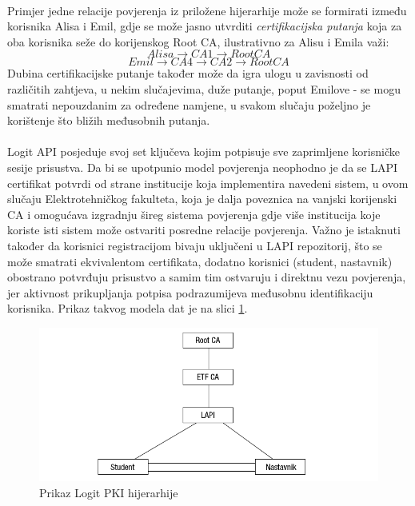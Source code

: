 \paragraph*{}
Primjer jedne relacije povjerenja iz priložene hijerarhije može se formirati između korisnika Alisa i Emil, gdje se može jasno utvrditi \textit{certifikacijska putanja} koja za oba korisnika seže do korijenskog Root CA, ilustrativno za Alisu i Emila važi: \[Alisa \to CA1 \to Root CA\] \[Emil \to CA4 \to CA2 \to Root CA\] Dubina certifikacijske putanje također može da igra ulogu u zavisnosti od različitih zahtjeva, u nekim slučajevima, duže putanje, poput Emilove - se mogu smatrati nepouzdanim za određene namjene, u svakom slučaju poželjno je korištenje što bližih međusobnih putanja.

\paragraph*{}
Logit API posjeduje svoj set ključeva kojim potpisuje sve zaprimljene korisničke sesije prisustva. Da bi se upotpunio model povjerenja neophodno je da se LAPI certifikat potvrdi od strane institucije koja implementira navedeni sistem, u ovom slučaju Elektrotehničkog fakulteta, koja je dalja poveznica na vanjski korijenski CA i omogućava izgradnju šireg sistema povjerenja gdje više institucija koje koriste isti sistem može ostvariti posredne relacije povjerenja. Važno je istaknuti također da korisnici registracijom bivaju uključeni u LAPI repozitorij, što se može smatrati ekvivalentom certifikata, dodatno korisnici (student, nastavnik) obostrano potvrđuju prisustvo a samim tim ostvaruju i direktnu vezu povjerenja, jer aktivnost prikupljanja potpisa podrazumijeva međusobnu identifikaciju korisnika. Prikaz takvog modela dat je na slici \ref{fig:logit_pki}.

\begin{figure}[H]
    \centering
    \includegraphics[width=1.0\textwidth]{material/logit_pki}
    \caption{Prikaz Logit PKI hijerarhije}
    \label{fig:logit_pki}
\end{figure}

